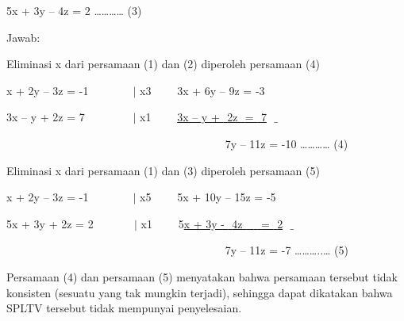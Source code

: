 \documentclass[11pt,fleqn]{book} %
\begin{document}
\begin{myEnumerate}
\begin{itemize}
		\noindent 
		5x + 3y – 4z = 2 ………… (3) \par
		\vspace{12pt}
		\vspace{12pt}
		\vspace{12pt}
		\vspace{12pt}
		\noindent 
		Jawab: \par
		\noindent 
		Eliminasi x dari persamaan (1) dan (2) diperoleh persamaan (4) \par
		\noindent 
		x + 2y – 3z = -1 $  $ $  $ $  $ $  $ $  $ $  $ $  $ $  $ $  $ $  $ $  $ $  \vert  $ x3 $  $ $  $ $  $ $  $ $  $ $  $ $  $3x + 6y – 9z = -3 \par
		\noindent 
		3x – y + 2z = 7 $  $ $  $ $  $ $  $ $  $ $  $ $  $ $  $ $  $ $  $ $  $ $  $ $  \vert  $ x1 $  $ $  $ $  $ $  $ $  $ $  $ $  $\underline{3x – y + $  $ $  $2z $  $ $  $= $  $ $  $7} $  $ $  \_  $ \par
		\noindent 
		$  $ $  $ $  $ $  $ $  $ $  $ $  $ $  $ $  $ $  $ $  $ $  $ $  $ $  $ $  $ $  $ $  $ $  $ $  $ $  $ $  $ $  $ $  $ $  $ $  $ $  $ $  $ $  $ $  $ $  $ $  $ $  $ $  $ $  $ $  $ $  $ $  $ $  $ $  $ $  $ $  $ $  $ $  $ $  $ $  $ $  $ $  $ $  $ $  $ $  $ $  $ $  $ $  $ $  $ $  $ $  $ $  $ $  $ $  $ $  $7y – 11z = -10 ………… (4) \par
		\noindent 
		Eliminasi x dari persamaan (1) dan (3) diperoleh persamaan (5) \par
		\noindent 
		x + 2y – 3z = -1 $  $ $  $ $  $ $  $ $  $ $  $ $  $ $  $ $  $ $  $ $  $ $  \vert  $ x5 $  $ $  $ $  $ $  $ $  $ $  $ $  $5x + 10y – 15z = -5 \par
		\noindent 
		5x + 3y + 2z = 2 $  $ $  $ $  $ $  $ $  $ $  $ $  $ $  $ $  $ $  $ $  \vert  $ x1 $  $ $  $ $  $ $  $ $  $ $  $ $  $5\underline{x + 3y - $  $ $  $4z $  $ $  $ $  $ $  $ $  $= $  $ $  $2} $  $ $  \_  $ \par
		\noindent 
		$  $ $  $ $  $ $  $ $  $ $  $ $  $ $  $ $  $ $  $ $  $ $  $ $  $ $  $ $  $ $  $ $  $ $  $ $  $ $  $ $  $ $  $ $  $ $  $ $  $ $  $ $  $ $  $ $  $ $  $ $  $ $  $ $  $ $  $ $  $ $  $ $  $ $  $ $  $ $  $ $  $ $  $ $  $ $  $ $  $ $  $ $  $ $  $ $  $ $  $ $  $ $  $ $  $ $  $ $  $ $  $ $  $ $  $ $  $ $  $7y – 11z = -7 ………..… (5) \par
		\noindent 
		Persamaan (4) dan persamaan (5) menyatakan bahwa persamaan tersebut tidak konsisten (sesuatu yang tak mungkin terjadi), sehingga dapat dikatakan bahwa SPLTV tersebut tidak mempunyai penyelesaian. \par
		\vspace{12pt}

\end{itemize}
\end{myEnumerate}
\end{document}
